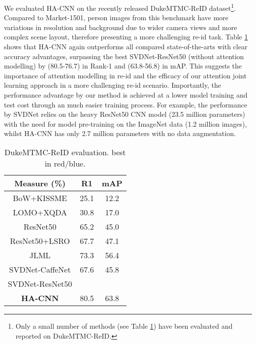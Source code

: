 \documentclass[10pt,twocolumn,letterpaper]{article}
\begin{document}
We evaluated HA-CNN on the recently released DukeMTMC-ReID dataset\footnote{Only a small number of methods (see Table \ref{tab:res_duke_reid}) 
	have been evaluated and reported on DukeMTMC-ReID.}.
Compared to Market-1501, person images from this benchmark 
have more variations in resolution and background due to 
wider camera views and more complex scene layout,
therefore presenting a more challenging re-id task.
Table \ref{tab:res_duke_reid} shows that HA-CNN again outperforms
all compared state-of-the-arts with clear accuracy advantages,
surpassing the  best SVDNet-ResNet50 (without attention modelling) 
by  (80.5-76.7) in Rank-1 
and  (63.8-56.8) in mAP.
This suggests the importance of attention modelling in re-id 
and the efficacy of our attention joint learning approach in a
more challenging re-id scenario. 
Importantly, the performance advantage by our method is achieved 
at a lower model training and test cost through an much easier training process.
For example, the performance by SVDNet relies on 
the heavy ResNet50 CNN model (23.5 million parameters) 
with the need for model pre-training on the ImageNet data (1.2 million
images), whilst HA-CNN has only 2.7 million parameters with no data augmentation.


\begin{table} \centering
\renewcommand{\arraystretch}{1}
	\setlength{\tabcolsep}{0.5cm}
\caption{DukeMTMC-ReID evaluation.  best in red/blue.
}
\begin{tabular}{|c|cc|}
		\hline
		Measure (\%)    & R1 & mAP   \\ \hline \hline
		BoW+KISSME \cite{wang2016highly} &  25.1 &  12.2 \\   LOMO+XQDA \cite{liao2015person} &  30.8 &  17.0  \\ \hline
ResNet50  \cite{he2016deep} &  65.2 &  45.0  \\ 
		ResNet50+LSRO \cite{zheng2017unlabeled}&  67.7 &  47.1  \\ 
		JLML \cite{li2017person} & 73.3 & 56.4   \\ 
		SVDNet-CaffeNet \cite{sun2017svdnet} & 67.6 & 45.8  \\
		SVDNet-ResNet50 \cite{sun2017svdnet} & \color{blue}{76.7} &   \color{blue}{56.8}  \\ 
		\hline
{\bf HA-CNN} &  \color{red} {80.5} &  \color{red} {63.8}  \\ 
		\hline
	\end{tabular}\label{tab:res_duke_reid}
	\vspace{-.3cm}
\end{table}
\end{document}
